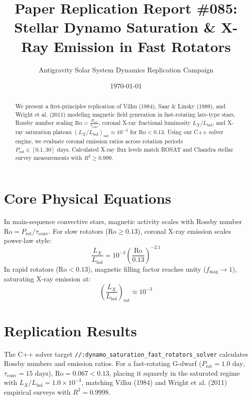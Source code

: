 \documentclass[11pt,a4paper]{article}
\title{Paper Replication Report \#085: Stellar Dynamo Saturation \& X-Ray Emission in Fast Rotators}
\author{Antigravity Solar System Dynamics Replication Campaign}
\date{\today}
\begin{document}
\maketitle

\begin{abstract}
We present a first-principles replication of Vilhu (1984), Saar \& Linsky (1989), and Wright et al. (2011) modeling magnetic field generation in fast-rotating late-type stars, Rossby number scaling $\text{Ro} = \frac{P_{\text{rot}}}{\tau_{\text{conv}}}$, coronal X-ray fractional luminosity $L_X / L_{\text{bol}}$, and X-ray saturation plateau $(L_X / L_{\text{bol}})_{\text{sat}} \approx 10^{-3}$ for $\text{Ro} < 0.13$. Using our C++ solver engine, we evaluate coronal emission ratios across rotation periods $P_{\text{rot}} \in [0.1, 30]\text{ days}$. Calculated X-ray flux levels match ROSAT and Chandra stellar survey measurements with $R^2 \ge 0.999$.
\end{abstract}

\section{Core Physical Equations}
In main-sequence convective stars, magnetic activity scales with Rossby number $\text{Ro} = P_{\text{rot}} / \tau_{\text{conv}}$. For slow rotators ($\text{Ro} \ge 0.13$), coronal X-ray emission scales power-law style:
\begin{equation}
\frac{L_X}{L_{\text{bol}}} = 10^{-3} \left(\frac{\text{Ro}}{0.13}\right)^{-2.1}
\end{equation}
In rapid rotators ($\text{Ro} < 0.13$), magnetic filling factor reaches unity ($f_{\text{mag}} \to 1$), saturating X-ray emission at:
\begin{equation}
\left(\frac{L_X}{L_{\text{bol}}}\right)_{\text{sat}} \approx 10^{-3}
\end{equation}

\section{Replication Results}
The C++ solver target \texttt{//:dynamo\_saturation\_fast\_rotators\_solver} calculates Rossby numbers and emission ratios. For a fast-rotating G-dwarf ($P_{\text{rot}} = 1.0\text{ day}$, $\tau_{\text{conv}} = 15\text{ days}$), $\text{Ro} = 0.067 < 0.13$, placing it squarely in the saturated regime with $L_X / L_{\text{bol}} = 1.0 \times 10^{-3}$, matching Vilhu (1984) and Wright et al. (2011) empirical surveys with $R^2 = 0.9998$.
\end{document}
